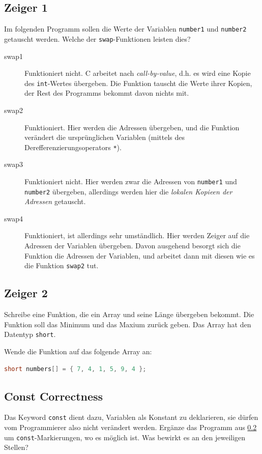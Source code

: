 \documentclass[11pt, a4paper]{article}
\begin{document}
\subsection{Zeiger 1}
Im folgenden Programm sollen die Werte der Variablen \texttt{number1} und \texttt{number2} getauscht werden. Welche der \texttt{swap}-Funktionen leisten dies?

\begin{description}
	\item[swap1] Funktioniert nicht. C arbeitet nach \emph{call-by-value}, d.h. es wird eine Kopie des \texttt{int}-Wertes übergeben. Die Funktion tauscht die Werte ihrer Kopien, der Rest des Programms bekommt davon nichts mit.
	\item[swap2] Funktioniert. Hier werden die Adressen übergeben, und die Funktion verändert die ursprünglichen Variablen (mittels des Derefferenzierungsoperators \texttt{*}).
	\item[swap3] Funktioniert nicht. Hier werden zwar die Adressen von \texttt{number1} und \texttt{number2} übergeben, allerdings werden hier die \emph{lokalen Kopieen der Adressen} getauscht.
	\item[swap4] Funktioniert, ist allerdings sehr umständlich. Hier werden Zeiger auf die Adressen der Variablen übergeben. Davon ausgehend besorgt sich die Funktion die Adressen der Variablen, und arbeitet dann mit diesen wie es die Funktion \texttt{swap2} tut.
\end{description}

\subsection{Zeiger 2}
\label{zeigerAufgabe}
Schreibe eine Funktion, die ein Array und seine Länge übergeben bekommt. Die Funktion soll das Minimum und das Maxium zurück geben. Das Array hat den Datentyp \texttt{short}.

Wende die Funktion auf das folgende Array an:
\begin{lstlisting}[language=C]
	short numbers[] = { 7, 4, 1, 5, 9, 4 };
\end{lstlisting}


\subsection{Const Correctness}
Das Keyword \texttt{const} dient dazu, Variablen als Konstant zu deklarieren, sie dürfen vom Programmierer also nicht verändert werden. Ergänze das Programm aus \ref{zeigerAufgabe} um \texttt{const}-Markierungen, wo es möglich ist. Was bewirkt es an den jeweiligen Stellen?

\end{document}
